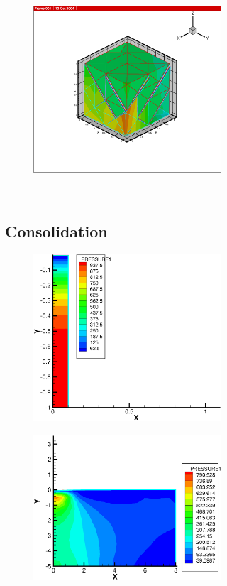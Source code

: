 {\begin{figure}[htb!]
  \includegraphics[width=7cm]{figures/m_brick_l.eps}\\
\end{figure}

\newpage $ $ \newpage
\subsection{Consolidation}

\begin{figure}[htb!]
  \includegraphics[width=7cm]{figures/hm_tri.eps}\\
\end{figure}

\begin{figure}[htb!]
  \includegraphics[width=7cm]{figures/hm_foot_tri.eps}\\
\end{figure}

}
